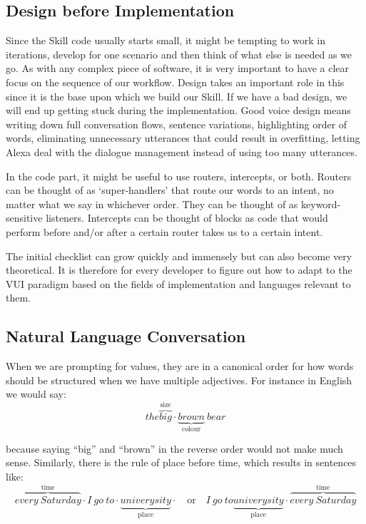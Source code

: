 \subsection*{Design before Implementation}
Since the Skill code usually starts small, it might be tempting to work in iterations, develop for one scenario and then think of what else is needed as we go.
As with any complex piece of software, it is very important to have a clear focus on the sequence of our workflow. Design takes an important role in this since it is the base upon which we build our Skill. If we have a bad design, we will end up getting stuck during the implementation. Good voice design means writing down full conversation flows, sentence variations, highlighting order of words, eliminating unnecessary utterances that could result in overfitting, letting Alexa deal with the dialogue management instead of using too many utterances.

In the code part, it might be useful to use routers, intercepts, or both.
Routers can be thought of as `super-handlers' that route our words to an intent, no matter what we say in whichever order. They can be thought of as keyword-sensitive listeners. Intercepts can be thought of blocks as code that would perform before and/or after a certain router takes us to a certain intent.

The initial checklist can grow quickly and immensely but can also become very theoretical. It is therefore for every developer to figure out how to adapt to the VUI paradigm based on the fields of implementation and languages relevant to them. %



\subsection*{Natural Language Conversation}
When we are prompting for values, they are in a canonical order for how words should be structured when we have multiple adjectives. For instance in English we would say:
\[
	the 
\overbrace{big}^\text{size} \cdot
\underbrace{brown}_\text{colour}
\ bear 
\]

\noindent because saying ``big'' and ``brown'' in the reverse order would not make much sense. Similarly, there is the rule of place before time, which results in sentences like: 
	\[
	\overbrace{every \ Saturday}^\text{time} \cdot
		I \ go \ to  \cdot
	\underbrace{univerysity}_\text{place} \cdot
	\quad \textrm{or} \quad
	I \ go \ to 
	\underbrace{univerysity}_\text{place} \cdot
	\overbrace{every \ Saturday}^\text{time}
	\]

